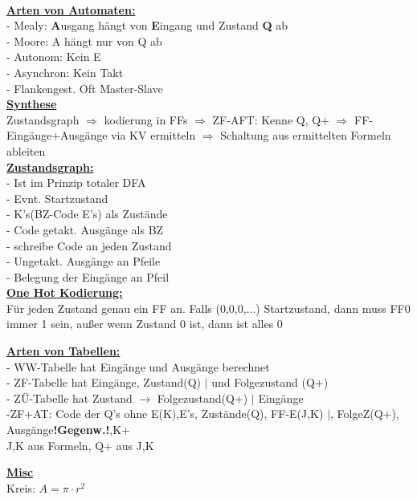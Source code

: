 \documentclass[8pt]{extarticle}
\begin{document}
~~~~~~~
\begin{minipage}{0.33\textwidth}

\underline{\textbf{Arten von Automaten:}}\\
- Mealy: \textbf{A}usgang hängt von \textbf{E}ingang und Zustand \textbf{Q} ab \\
- Moore: A hängt nur von Q ab \\
- Autonom: Kein E \\
- Asynchron: Kein Takt \\
- Flankengest. Oft Master-Slave \\

\underline{\textbf{Synthese}}\\
Zustandsgraph $\Rightarrow$ kodierung in FFs $\Rightarrow$ ZF-AFT: Kenne Q, Q+ $\Rightarrow$ FF-Eingänge+Ausgänge via KV ermitteln $\Rightarrow$ Schaltung aus ermittelten Formeln ableiten\\

\underline{\textbf{Zustandsgraph:}}\\
- Ist im Prinzip totaler DFA\\
- Evnt. Startzustand\\
- K's(BZ-Code E's) als Zustände\\
- Code getakt. Ausgänge als BZ\\
- schreibe Code an jeden Zustand\\
- Ungetakt. Ausgänge an Pfeile\\
- Belegung der Eingänge an Pfeil\\

\underline{\textbf{One Hot Kodierung:}}\\
Für jeden Zustand genau ein FF an. Falls (0,0,0,...) Startzustand, dann muss FF0 immer 1 sein, außer wenn Zustand 0 ist, dann ist alles 0
\end{minipage}%

\vspace*{-0.3 cm}
\underline{\textbf{Arten von Tabellen:}}\\
- WW-Tabelle hat Eingänge und Ausgänge berechnet\\
- ZF-Tabelle hat Eingänge, Zustand(Q) $|$ und Folgezustand (Q+)\\
- ZÜ-Tabelle hat Zustand $\rightarrow$ Folgezustand(Q+) $|$ Eingänge\\
-ZF+AT: Code der Q's ohne E(K),E's, Zustände(Q), FF-E(J,K) $|$, FolgeZ(Q+), Ausgänge\textbf{!Gegenw.!},K+\\
\phantom{ss} J,K aus Formeln, Q+ aus J,K


\underline{\textbf{Misc}}\\
Kreis: $A = \pi \cdot r^2$\\
\end{document}
